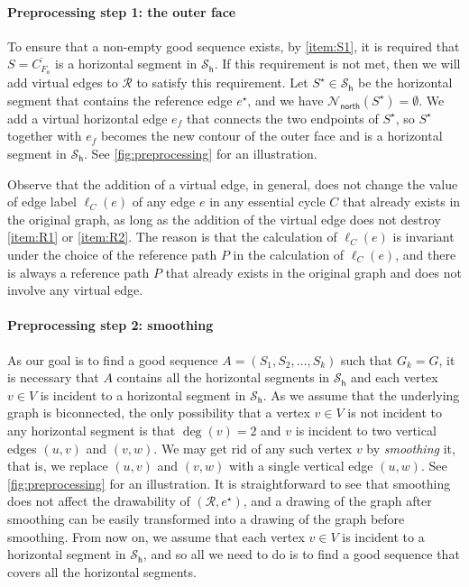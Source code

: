 \documentclass{article}\usepackage[a4paper,margin=20mm]{geometry}
\newcommand{\RR}{\mathcal{R}}
\newcommand{\FO}{F_\mathsf{o}}
\newcommand{\PH}{\mathcal{S}_\mathsf{h}}
\newcommand{\Nnorth}{\mathcal{N}_\mathsf{north}}
\newcommand{\eref}{e^\star}
\begin{document}
 \paragraph{Preprocessing step 1: the outer face} To ensure that a non-empty good sequence exists, by \ref{item:S1}, it is required that $S  = \overline{C_{\FO}}$ is a horizontal segment in $\PH$. If this requirement is not met, then we will add virtual edges to $\RR$ to satisfy this requirement. Let $S^\star \in \PH$ be the horizontal segment that contains the reference edge $\eref$, and we have $\Nnorth(S^\star) = \emptyset$. We add a virtual horizontal edge $e_f$ that connects the two endpoints of $S^\star$, so $S^\star$ together with $e_f$ becomes the new contour of the outer face and is a horizontal segment in $\PH$. See \cref{fig:preprocessing} for an illustration.
 
 Observe that the addition of a virtual edge, in general, does not change the value of edge label $\ell_C(e)$ of any edge $e$ in any essential cycle $C$ that already exists in the original graph, as long as the addition of the virtual edge does not destroy \ref{item:R1} or \ref{item:R2}. The reason is that the calculation of $\ell_C(e)$ is invariant under the choice of the reference path $P$ in the calculation of $\ell_C(e)$, and there is always a reference path $P$ that already exists in the original graph and does not involve any virtual edge.  

 \paragraph{Preprocessing step 2: smoothing} As our goal is to find a good sequence $A=(S_1, S_2, \ldots, S_{k})$ such that $G_k = G$, it is necessary that $A$ contains all the  horizontal segments in $\PH$ and each vertex $v \in V$ is incident to a horizontal segment in $\PH$. As we assume that the underlying graph is biconnected, the only possibility that a vertex $v \in V$ is not incident to any horizontal segment is that $\deg(v) = 2$ and $v$ is incident to two vertical edges $(u,v)$ and $(v,w)$. We may get rid of any such vertex $v$ by \emph{smoothing} it, that is, we replace $(u,v)$ and $(v,w)$ with a single vertical edge $(u,w)$. See \cref{fig:preprocessing} for an illustration. It is straightforward to see that smoothing does not affect the drawability of $(\RR,\eref)$, and a drawing of the graph after smoothing can be easily transformed into a drawing of the graph before smoothing.
 From now on, we assume that each vertex $v \in V$ is incident to a horizontal segment in $\PH$, and so all we need to do is to find a good sequence that covers all the horizontal segments. 
\end{document}
